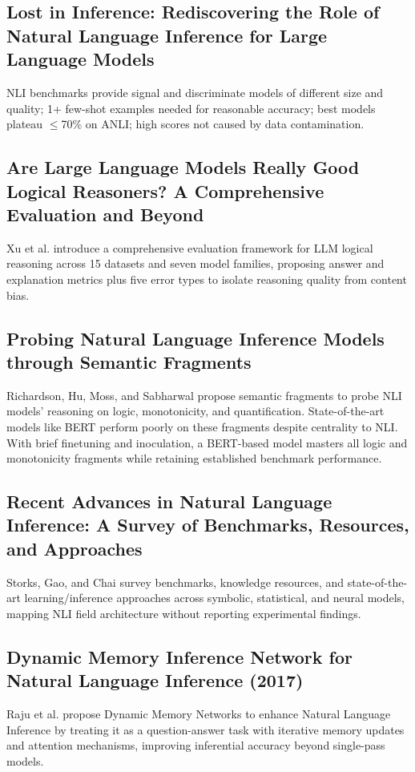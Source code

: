 \documentclass{article}\usepackage{amsmath,amssymb,graphicx,url}
\begin{document}
\subsection{Lost in Inference: Rediscovering the Role of Natural Language Inference for Large Language Models}
NLI benchmarks provide signal and discriminate models of different size and quality; 1+ few-shot examples needed for reasonable accuracy; best models plateau $\leq$70\% on ANLI; high scores not caused by data contamination. \cite{madaan2024lost}

\subsection{Are Large Language Models Really Good Logical Reasoners? A Comprehensive Evaluation and Beyond}
Xu et al. introduce a comprehensive evaluation framework for LLM logical reasoning across 15 datasets and seven model families, proposing answer and explanation metrics plus five error types to isolate reasoning quality from content bias. \cite{xu2023large}

\subsection{Probing Natural Language Inference Models through Semantic Fragments}
Richardson, Hu, Moss, and Sabharwal propose semantic fragments to probe NLI models' reasoning on logic, monotonicity, and quantification. State-of-the-art models like BERT perform poorly on these fragments despite centrality to NLI. With brief finetuning and inoculation, a BERT-based model masters all logic and monotonicity fragments while retaining established benchmark performance. \cite{richardson2020probing}

\subsection{Recent Advances in Natural Language Inference: A Survey of Benchmarks, Resources, and Approaches}
Storks, Gao, and Chai survey benchmarks, knowledge resources, and state-of-the-art learning/inference approaches across symbolic, statistical, and neural models, mapping NLI field architecture without reporting experimental findings. \cite{storks2019recent}

\subsection{Dynamic Memory Inference Network for Natural Language Inference (2017)}
Raju et al. propose Dynamic Memory Networks to enhance Natural Language Inference by treating it as a question-answer task with iterative memory updates and attention mechanisms, improving inferential accuracy beyond single-pass models. \cite{raju2017dynamic}
\end{document}
